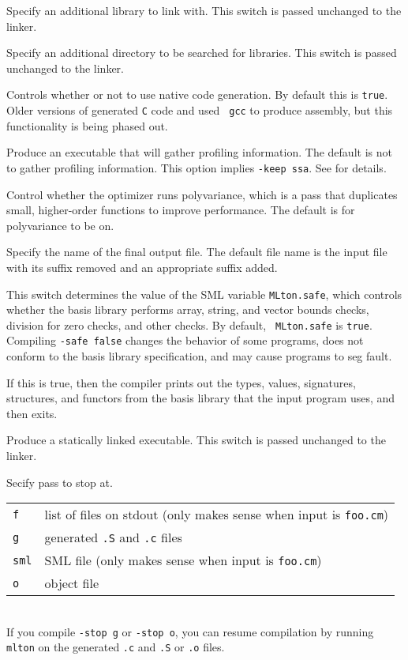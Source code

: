 \begin{description}
Specify an additional library to link with.
This switch is passed unchanged to the linker.

Specify an additional directory to be searched for libraries.
This switch is passed unchanged to the linker.

Controls whether or not to use native code generation.  By default this is
{\tt true}.  Older versions of {\mlton} generated {\tt C} code and used {\tt
gcc} to produce assembly, but this functionality is being phased out.

Produce an executable that will gather profiling information.  The default is
not to gather profiling information.  This option implies {\tt -keep ssa}.
See  for details.

Control whether the optimizer runs polyvariance, which is a pass that duplicates
small, higher-order functions to improve performance.  The default is for
polyvariance to be on.

Specify the name of the final output file.
The default file name is the input file with its
suffix removed and an appropriate suffix added.

This switch determines the value of the SML variable {\tt MLton.safe}, which
controls whether the basis library performs array, string, and vector bounds
checks, division for zero checks, and other checks.  By default, {\tt
MLton.safe} is {\tt true}.  Compiling {\tt -safe false} changes the behavior of
some programs, does not conform to the basis library specification, and may
cause programs to seg fault.

If this is true, then the compiler prints out the types, values, signatures,
structures, and functors from the basis library that the input program uses, and
then exits.

Produce a statically linked executable.  This switch is passed unchanged to the
linker.

Secify pass to stop at.\\
\begin{tabular}{ll}
{\tt f} & list of files on stdout (only makes sense when input is {\tt foo.cm})\\
{\tt g} & generated {\tt .S} and {\tt .c} files\\
{\tt sml} & SML file (only makes sense when input is {\tt foo.cm})\\
{\tt o} & object file\\
\end{tabular}\\
If you compile {\tt -stop g} or {\tt -stop o}, you can resume compilation by
running {\tt mlton} on the generated {\tt .c} and {\tt .S} or {\tt .o} files.


\end{description}
